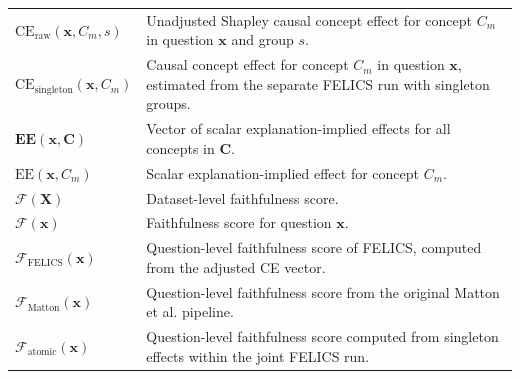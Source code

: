 \begin{longtable}{@{}>{\raggedright\arraybackslash}p{} p{}@{}}
	$\mathrm{CE}_{\mathrm{raw}}(\mathbf{x},C_m,s)$     & Unadjusted Shapley causal concept effect for concept $C_m$ in question $\mathbf{x}$ and group $s$.                                                                                                                 \\
	$\mathrm{CE}_{\mathrm{singleton}}(\mathbf{x},C_m)$ & Causal concept effect for concept $C_m$ in question $\mathbf{x}$, estimated from the separate FELICS run with singleton groups.                                                                                    \\
	$\mathbf{EE}(\mathbf{x},\mathbf{C})$               & Vector of scalar explanation-implied effects for all concepts in $\mathbf{C}$.                                                                                                                                     \\
	$\mathrm{EE}(\mathbf{x},C_m)$                      & Scalar explanation-implied effect for concept $C_m$.                                                                                                                                                               \\
	$\mathcal{F}(\mathbf{X})$                          & Dataset-level faithfulness score.                                                                                                                                                                                  \\
	$\mathcal{F}(\mathbf{x})$                          & Faithfulness score for question $\mathbf{x}$.                                                                                                                                                                      \\
	$\mathcal{F}_{\mathrm{FELICS}}(\mathbf{x})$        & Question-level faithfulness score of FELICS, computed from the adjusted CE vector.                                                                                                                                 \\
	$\mathcal{F}_{\mathrm{Matton}}(\mathbf{x})$        & Question-level faithfulness score from the original Matton et al. \cite{mattonWalkTalkMeasuring2024} pipeline.                                                                                                     \\
	$\mathcal{F}_{\mathrm{atomic}}(\mathbf{x})$        & Question-level faithfulness score computed from singleton effects within the joint FELICS run.                                                                                                                     \\

\end{longtable}
